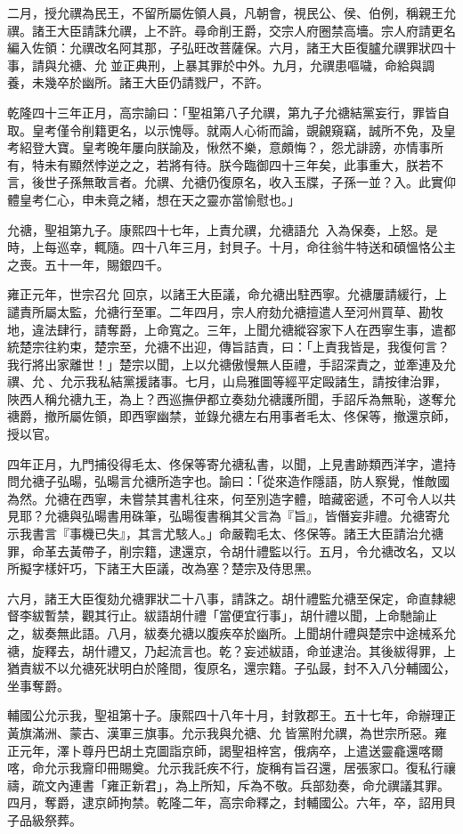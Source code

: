 \begin{pinyinscope}
二月，授允禩為民王，不留所屬佐領人員，凡朝會，視民公、侯、伯例，稱親王允禩。諸王大臣請誅允禩，上不許。尋命削王爵，交宗人府圈禁高墻。宗人府請更名編入佐領：允禩改名阿其那，子弘旺改菩薩保。六月，諸王大臣復臚允禩罪狀四十事，請與允禟、允並正典刑，上暴其罪於中外。九月，允禩患嘔噦，命給與調養，未幾卒於幽所。諸王大臣仍請戮尸，不許。

乾隆四十三年正月，高宗諭曰：「聖祖第八子允禩，第九子允禟結黨妄行，罪皆自取。皇考僅令削籍更名，以示愧辱。就兩人心術而論，覬覦窺竊，誠所不免，及皇考紹登大寶。皇考晚年屢向朕諭及，愀然不樂，意頗悔？，怨尤誹謗，亦情事所有，特未有顯然悖逆之之，若將有待。朕今臨御四十三年矣，此事重大，朕若不言，後世子孫無敢言者。允禩、允禟仍復原名，收入玉牒，子孫一並？入。此實仰體皇考仁心，申未竟之緒，想在天之靈亦當愉慰也。」

允禟，聖祖第九子。康熙四十七年，上責允禩，允禟語允，入為保奏，上怒。是時，上每巡幸，輒隨。四十八年三月，封貝子。十月，命往翁牛特送和碩慍恪公主之喪。五十一年，賜銀四千。

雍正元年，世宗召允回京，以諸王大臣議，命允禟出駐西寧。允禟屢請緩行，上譴責所屬太監，允禟行至軍。二年四月，宗人府劾允禟擅遣人至河州買草、勘牧地，違法肆行，請奪爵，上命寬之。三年，上聞允禟縱容家下人在西寧生事，遣都統楚宗往約束，楚宗至，允禟不出迎，傳旨詰責，曰：「上責我皆是，我復何言？我行將出家離世！」楚宗以聞，上以允禟傲慢無人臣禮，手詔深責之，並牽連及允禩、允、允示我私結黨援諸事。七月，山烏雅圖等經平定毆諸生，請按律治罪，陜西人稱允禟九王，為上？西巡撫伊都立奏劾允禟護所聞，手詔斥為無恥，遂奪允禟爵，撤所屬佐領，即西寧幽禁，並錄允禟左右用事者毛太、佟保等，撤還京師，授以官。

四年正月，九門捕役得毛太、佟保等寄允禟私書，以聞，上見書跡類西洋字，遣持問允禟子弘暘，弘暘言允禟所造字也。諭曰：「從來造作隱語，防人察覺，惟敵國為然。允禟在西寧，未嘗禁其書札往來，何至別造字體，暗藏密遞，不可令人以共見耶？允禟與弘暘書用硃筆，弘暘復書稱其父言為『旨』，皆僭妄非禮。允禟寄允示我書言『事機已失』，其言尤駭人。」命嚴鞫毛太、佟保等。諸王大臣請治允禟罪，命革去黃帶子，削宗籍，逮還京，令胡什禮監以行。五月，令允禟改名，又以所擬字樣奸巧，下諸王大臣議，改為塞？楚宗及侍思黑。

六月，諸王大臣復劾允禟罪狀二十八事，請誅之。胡什禮監允禟至保定，命直隸總督李紱暫禁，觀其行止。紱語胡什禮「當便宜行事」，胡什禮以聞，上命馳諭止之，紱奏無此語。八月，紱奏允禟以腹疾卒於幽所。上聞胡什禮與楚宗中途械系允禟，旋釋去，胡什禮又，乃起流言也。乾？妄述紱語，命並逮治。其後紱得罪，上猶責紱不以允禟死狀明白於隆間，復原名，還宗籍。子弘晸，封不入八分輔國公，坐事奪爵。

輔國公允示我，聖祖第十子。康熙四十八年十月，封敦郡王。五十七年，命辦理正黃旗滿洲、蒙古、漢軍三旗事。允示我與允禟、允皆黨附允禩，為世宗所惡。雍正元年，澤卜尊丹巴胡土克圖詣京師，謁聖祖梓宮，俄病卒，上遣送靈龕還喀爾喀，命允示我齎印冊賜奠。允示我託疾不行，旋稱有旨召還，居張家口。復私行禳禱，疏文內連書「雍正新君」，為上所知，斥為不敬。兵部劾奏，命允禩議其罪。四月，奪爵，逮京師拘禁。乾隆二年，高宗命釋之，封輔國公。六年，卒，詔用貝子品級祭葬。


\end{pinyinscope}
